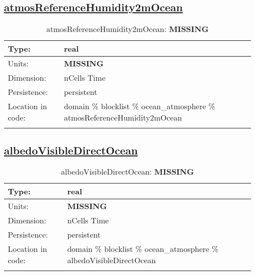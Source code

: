 \subsection[atmosReferenceHumidity2mOcean]{\hyperref[sec:var_tab_ocean_atmosphere]{atmosReferenceHumidity2mOcean}}
\label{subsec:var_sec_ocean_atmosphere_atmosReferenceHumidity2mOcean}
\begin{center}
\begin{longtable}{| p{2.0in} | p{4.0in} |}
        \hline 
        Type: & real \\
        \hline 
        Units: & {\bf \color{red} MISSING} \\
        \hline 
        Dimension: & nCells Time \\
        \hline 
        Persistence: & persistent \\
        \hline 
         Location in code: & domain \% blocklist \% ocean\_atmosphere \% atmosReferenceHumidity2mOcean \\
         \hline 
    \caption{atmosReferenceHumidity2mOcean: {\bf \color{red} MISSING}}
\end{longtable}
\end{center}
\subsection[albedoVisibleDirectOcean]{\hyperref[sec:var_tab_ocean_atmosphere]{albedoVisibleDirectOcean}}
\label{subsec:var_sec_ocean_atmosphere_albedoVisibleDirectOcean}
\begin{center}
\begin{longtable}{| p{2.0in} | p{4.0in} |}
        \hline 
        Type: & real \\
        \hline 
        Units: & {\bf \color{red} MISSING} \\
        \hline 
        Dimension: & nCells Time \\
        \hline 
        Persistence: & persistent \\
        \hline 
         Location in code: & domain \% blocklist \% ocean\_atmosphere \% albedoVisibleDirectOcean \\
         \hline 
    \caption{albedoVisibleDirectOcean: {\bf \color{red} MISSING}}
\end{longtable}
\end{center}
